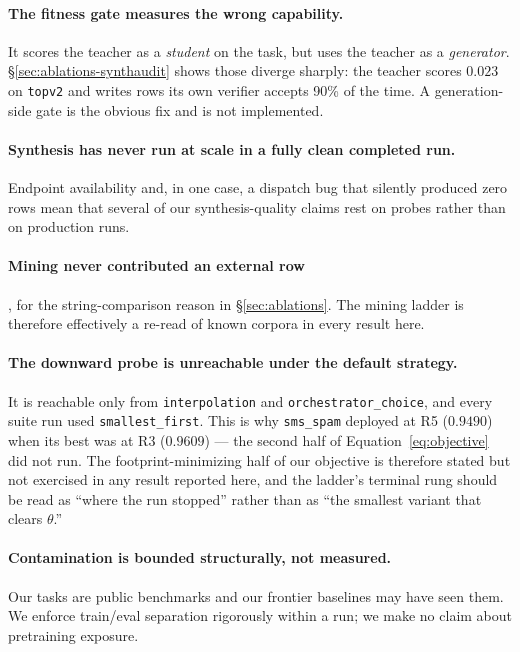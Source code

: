 \documentclass[sigconf,10pt]{acmart}
\newcommand{\xref}[1]{\S\ref{#1}}
\newcommand{\tsk}[1]{\texttt{#1}}
\begin{document}
\paragraph{The fitness gate measures the wrong capability.} It scores the teacher as a
\emph{student} on the task, but uses the teacher as a \emph{generator}.
\xref{sec:ablations-synthaudit} shows those diverge sharply: the teacher scores $0.023$ on
\tsk{topv2} and writes rows its own verifier accepts 90\% of the time. A generation-side gate
is the obvious fix and is not implemented.

\paragraph{Synthesis has never run at scale in a fully clean completed run.} Endpoint
availability and, in one case, a dispatch bug that silently produced zero rows mean that
several of our synthesis-quality claims rest on probes rather than on production runs.

\paragraph{Mining never contributed an external row}, for the string-comparison reason in
\xref{sec:ablations}. The mining ladder is therefore effectively a re-read of known corpora in
every result here.

\paragraph{The downward probe is unreachable under the default strategy.} It is reachable only
from \texttt{interpolation} and \texttt{orchestrator\_choice}, and every suite run used
\texttt{smallest\_first}. This is why \tsk{sms\_spam} deployed at R5 ($0.9490$) when its best
was at R3 ($0.9609$) --- the second half of Equation~\ref{eq:objective} did not run. The
footprint-minimizing half of our objective is therefore stated but not exercised in any
result reported here, and the ladder's terminal rung should be read as ``where the run
stopped'' rather than as ``the smallest variant that clears $\theta$.''

\paragraph{Contamination is bounded structurally, not measured.} Our tasks are public
benchmarks and our frontier baselines may have seen them. We enforce train/eval separation
rigorously within a run; we make no claim about pretraining exposure.
\end{document}
